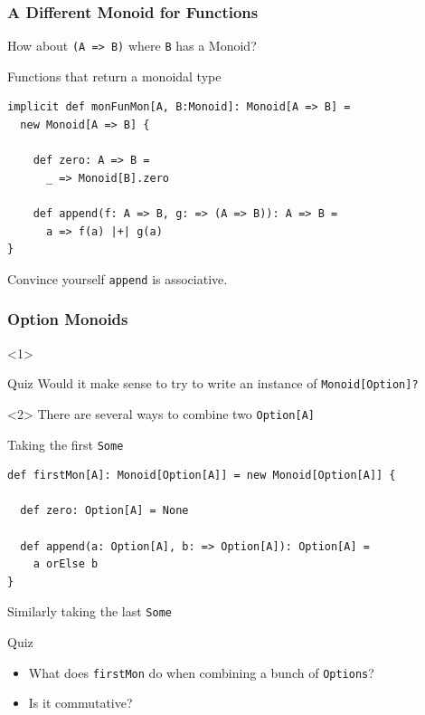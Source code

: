 \documentclass{beamer}
\begin{document}
\begin{frame}[fragile]
  \frametitle{A Different Monoid for Functions}
  How about \texttt{(A => B)} where \alert{\texttt{B} has a Monoid?}

  \begin{block}{Functions that return a monoidal type}
  \begin{lstlisting}
implicit def monFunMon[A, B:Monoid]: Monoid[A => B] =
  new Monoid[A => B] {

    def zero: A => B =
      _ => Monoid[B].zero

    def append(f: A => B, g: => (A => B)): A => B =
      a => f(a) |+| g(a)
}
  \end{lstlisting}
  \end{block}
  Convince yourself \texttt{append} is associative.
\end{frame}

\begin{frame}[fragile]
  \frametitle{Option Monoids}
  \begin{onlyenv}<1>
  \begin{block}{Quiz}
    Would it make sense to try to write an instance of
    \texttt{Monoid[Option]?}
  \end{block}
  \end{onlyenv}

  \begin{onlyenv}<2>
    There are several ways to combine two \texttt{Option[A]}

  \begin{block}{Taking the first \texttt{Some}}
  \begin{lstlisting}
def firstMon[A]: Monoid[Option[A]] = new Monoid[Option[A]] {

  def zero: Option[A] = None

  def append(a: Option[A], b: => Option[A]): Option[A] =
    a orElse b
}
  \end{lstlisting}
  \end{block}

  Similarly taking the last \texttt{Some}
  \begin{block}{Quiz}
    \begin{itemize}
    \item What does \texttt{firstMon} do when combining a bunch of \texttt{Options}?
    \item Is it commutative?
    \end{itemize}
  \end{block}
  \end{onlyenv}

\end{frame}
\end{document}
